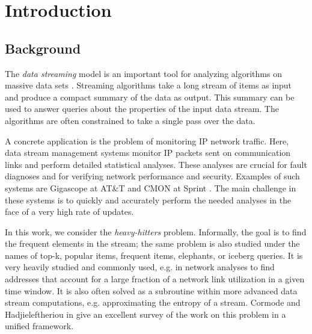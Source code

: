 \documentclass[sigconf,review=true,anonymous=true,screen]{acmart}
\begin{document}
%

%

%
\maketitle

\section{Introduction}
\subsection{Background}
The {\em data streaming} model is an important tool for analyzing algorithms on massive data sets \cite{Muthu05}. Streaming algorithms
take a long stream of items as input and produce a compact summary of the data as output. This summary can be used to answer queries about the properties of the input data stream. The algorithms are often constrained to take a single pass over the data.

A concrete application is the problem of monitoring IP network traffic. Here, data stream management systems monitor IP packets sent on communication links and perform detailed statistical analyses. These analyses are crucial for fault diagnoses and for verifying network performance and security. Examples of such systems are Gigascope at AT\&T \cite{Giga} and CMON at Sprint \cite{CMON}. The main challenge in these systems is to quickly and accurately perform the needed analyses in the face of a very high rate of updates.


In this work, we consider the {\em heavy-hitters} problem. Informally, the goal is to find the frequent elements in the stream; the same problem is also studied under the names of top-k, popular items, frequent items, elephants, or iceberg queries. It is very heavily studied and commonly used, e.g. in network analyses to find addresses that account for a large fraction of a network link utilization in a given time window. It is also often solved as a subroutine within more advanced data stream computations, e.g. approximating the entropy of a stream. Cormode and Hadjieleftheriou in \cite{FrequentSurvey} give an excellent survey of the work on this problem in a unified framework. 
\end{document}
